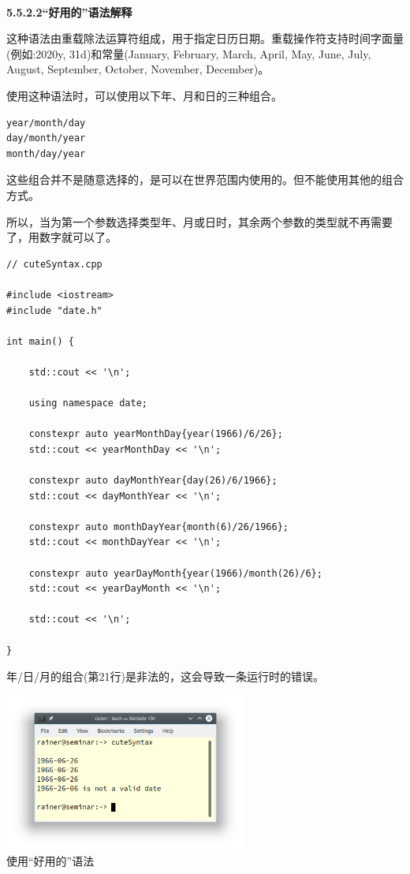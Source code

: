 \hspace*{\fill} \\ %
\noindent
\textbf{5.5.2.2\hspace{0.2cm}“好用的”语法解释}

这种语法由重载除法运算符组成，用于指定日历日期。重载操作符支持时间字面量(例如:2020y, 31d)和常量(January, February, March, April, May, June, July, August, September, October, November, December)。

使用这种语法时，可以使用以下年、月和日的三种组合。

\begin{lstlisting}[style=styleCXX]
year/month/day
day/month/year
month/day/year
\end{lstlisting}

这些组合并不是随意选择的，是可以在世界范围内使用的。但不能使用其他的组合方式。

所以，当为第一个参数选择类型年、月或日时，其余两个参数的类型就不再需要了，用数字就可以了。

\begin{lstlisting}[style=styleCXX]
// cuteSyntax.cpp

#include <iostream>
#include "date.h"

int main() {
	
	std::cout << '\n';
	
	using namespace date;
	
	constexpr auto yearMonthDay{year(1966)/6/26};
	std::cout << yearMonthDay << '\n';
	
	constexpr auto dayMonthYear{day(26)/6/1966};
	std::cout << dayMonthYear << '\n';
	
	constexpr auto monthDayYear{month(6)/26/1966};
	std::cout << monthDayYear << '\n';
	
	constexpr auto yearDayMonth{year(1966)/month(26)/6};
	std::cout << yearDayMonth << '\n';
	
	std::cout << '\n';

}
\end{lstlisting}

年/日/月的组合(第21行)是非法的，这会导致一条运行时的错误。

\begin{center}
\includegraphics[width=0.6\textwidth]{content/3/chapter5/images/21.png}\\
使用“好用的”语法
\end{center}

